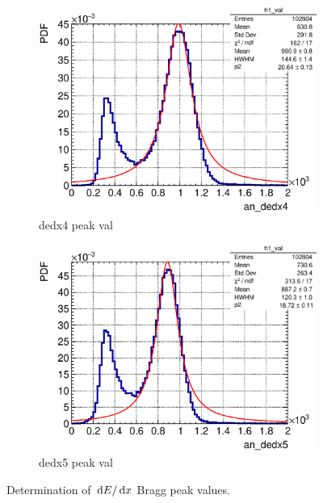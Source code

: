 \begin{figure}[t]
\begin{subfigure}{\trfigwid\textwidth}
       \end{subfigure}
       \begin{subfigure}{\trfigwid\textwidth}
            \includegraphics[width=\textwidth]{figures/sel/ans_dedx4_pdf_al2_selpr_con_test.eps}
            \caption{dedx4 peak val}
            \label{subfig:dedx4-peak}
       \end{subfigure}
       \begin{subfigure}{\trfigwid\textwidth}
            \includegraphics[width=\textwidth]{figures/sel/ans_dedx5_pdf_al2_selpr_con_test.eps}
            \caption{dedx5 peak val}
            \label{subfig:dedx5-peak}
       \end{subfigure}
       \caption{Determination of $\,\textrm{d}E/\,\textrm{d}x$ Bragg peak values.}
       \label{fig:esc-andedx-peaks}
    \end{figure}

